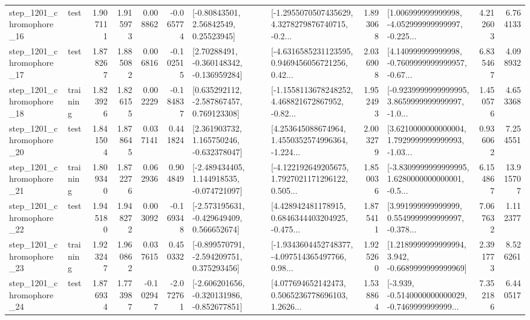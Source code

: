 \begin{tabular}{llrrrrllrlrr}
 step\_1201\_chromophore\_16 &      test &      1.907111 &    1.915973 &      0.008862 & -0.065774 &       [-0.80843501, 2.56842549, 0.25523945] &  [-1.2955070507435629, 4.3278279876740715, -0.2... &       1.893068 &  [1.006999999999998, -4.052999999999997, -0.225... &            4.212603 &          6.764133 \\
 step\_1201\_chromophore\_17 &      test &      1.878267 &    1.885082 &      0.006816 & -0.102515 &    [2.70288491, -0.360148342, -0.136959284] &  [-4.6316585231123595, 0.9469456056721256, 0.42... &       2.036908 &  [4.140999999999998, -0.7609999999999957, -0.67... &            6.835467 &          4.098932 \\
 step\_1201\_chromophore\_18 &  training &      1.823926 &    1.826155 &      0.002229 & -0.184837 &    [0.635292112, -2.587867457, 0.769123308] &  [-1.1558113678248252, 4.468821672867952, -0.82... &       1.952493 &  [-0.9239999999999995, 3.8659999999999997, -1.0... &            1.450576 &          4.653368 \\
 step\_1201\_chromophore\_20 &      test &      1.841504 &    1.878645 &      0.037141 &  0.441824 &    [2.361903732, 1.165750246, -0.632378047] &  [4.253645088674964, 1.4550352574996364, -1.224... &       2.003279 &  [3.6210000000000004, 1.7929999999999993, -1.03... &            0.936062 &          7.254551 \\
 step\_1201\_chromophore\_21 &  training &      1.809340 &    1.872276 &      0.062936 &  0.904849 &   [-2.489434405, 1.144918535, -0.074721097] &  [-4.122192649205675, 1.7927021171296122, 0.505... &       1.850036 &  [-3.8309999999999995, 1.6280000000000001, -0.5... &            6.154867 &         13.915707 \\
 step\_1201\_chromophore\_22 &      test &      1.945180 &    1.948272 &      0.003092 & -0.169348 &   [-2.573195631, -0.429649409, 0.566652674] &  [4.428942481178915, 0.6846344403204925, -0.475... &       1.875411 &  [3.991999999999999, 0.5549999999999997, -0.378... &            7.067632 &          1.112377 \\
 step\_1201\_chromophore\_23 &  training &      1.923247 &    1.960862 &      0.037615 &  0.450332 &   [-0.899570791, -2.594209751, 0.375293456] &  [-1.9343604452748377, -4.097514365497766, 0.98... &       1.925260 &   [1.2189999999999994, 3.942, -0.6689999999999969] &            2.391773 &          8.526261 \\
 step\_1201\_chromophore\_24 &      test &      1.876934 &    1.773987 &     -0.102947 & -2.072761 &  [-2.606201656, -0.320131986, -0.852677851] &  [4.077694652142473, 0.5065236778696103, 1.2626... &       1.538864 &  [-3.939, -0.5140000000000029, -0.7469999999999... &            7.352186 &          6.440517 \\

\end{tabular}
